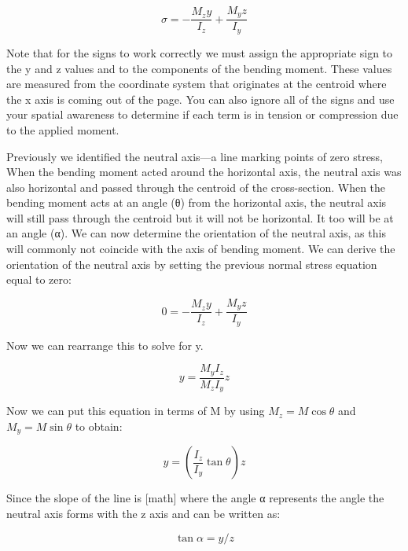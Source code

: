 \documentclass[
  letterpaper,
  DIV=11,
  numbers=noendperiod]{scrreprt}
\begin{document}
\[
\sigma=-\frac{M_z y}{I_z}+\frac{M_y z}{I_y}
\]

Note that for the signs to work correctly we must assign the appropriate
sign to the y and z values and to the components of the bending moment.
These values are measured from the coordinate system that originates at
the centroid where the x axis is coming out of the page. You can also
ignore all of the signs and use your spatial awareness to determine if
each term is in tension or compression due to the applied moment.

Previously we identified the neutral axis---a line marking points of
zero stress, When the bending moment acted around the horizontal axis,
the neutral axis was also horizontal and passed through the centroid of
the cross-section. When the bending moment acts at an angle (θ) from the
horizontal axis, the neutral axis will still pass through the centroid
but it will not be horizontal. It too will be at an angle (α). We can
now determine the orientation of the neutral axis, as this will commonly
not coincide with the axis of bending moment. We can derive the
orientation of the neutral axis by setting the previous normal stress
equation equal to zero:

\[
0=-\frac{M_z y}{I_z}+\frac{M_y z}{I_y}
\]

Now we can rearrange this to solve for y.

\[
y=\frac{M_y I_z}{M_z I_y} z
\]

Now we can put this equation in terms of M by using
\(M_z=M \cos \theta\) and \(M_y=M \sin \theta\) to obtain:

\[
y=\left(\frac{I_z}{I_y} \tan \theta\right) z
\]

Since the slope of the line is {[}math{]} where the angle α represents
the angle the neutral axis forms with the z axis and can be written as:

\[
\tan \alpha=y / z
\]
\end{document}
